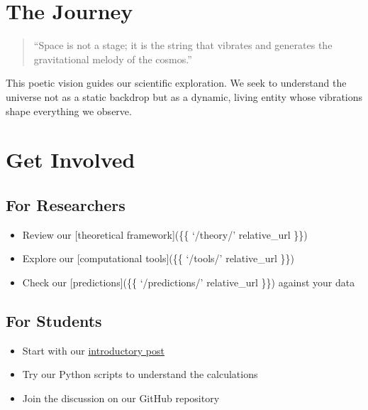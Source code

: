 \documentclass[
  11pt,
]{report}
\providecommand{\tightlist}{%
  \setlength{\itemsep}{0pt}\setlength{\parskip}{0pt}}
\begin{document}
\section{The Journey}\label{the-journey}

\begin{quote}
``Space is not a stage; it is the string that vibrates and generates the
gravitational melody of the cosmos.''
\end{quote}

This poetic vision guides our scientific exploration. We seek to
understand the universe not as a static backdrop but as a dynamic,
living entity whose vibrations shape everything we observe.

\section{Get Involved}\label{get-involved}

\subsection{For Researchers}\label{for-researchers}

\begin{itemize}
\tightlist
\item
  Review our {[}theoretical framework{]}(\{\{ `/theory/' \textbar{}
  relative\_url \}\})
\item
  Explore our {[}computational tools{]}(\{\{ `/tools/' \textbar{}
  relative\_url \}\})
\item
  Check our {[}predictions{]}(\{\{ `/predictions/' \textbar{}
  relative\_url \}\}) against your data
\end{itemize}

\subsection{For Students}\label{for-students}

\begin{itemize}
\tightlist
\item
  Start with our
  \href{\%7B\%7B\%20site.baseurl\%20\%7D\%7D\%7B\%\%20post_url\%202024-01-15-introduction-universe-membrane\%20\%\%7D}{introductory
  post}
\item
  Try our Python scripts to understand the calculations
\item
  Join the discussion on our GitHub repository
\end{itemize}
\end{document}
